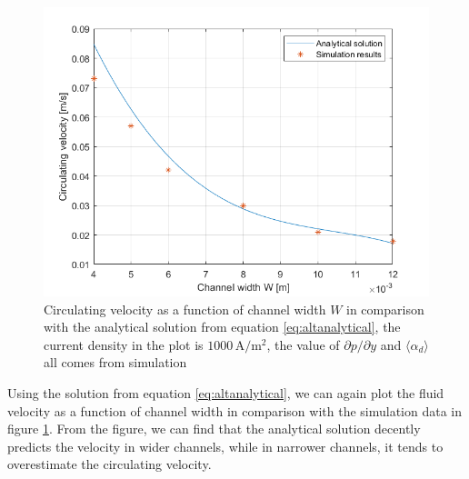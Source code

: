 \begin{figure}[H]
    \centering
    \includegraphics[scale = 0.7]{circulatingcomparison.png}
    \caption{Circulating velocity as a function of channel width $W$ in comparison with the analytical solution from equation \ref{eq:altanalytical}, the current density in the plot is $1000 \, \mathrm{A/m^2}$, the value of $\partial p/ \partial y$ and $\langle \alpha_d \rangle$ all comes from simulation}
    \label{circulatingcomparison}
\end{figure}

Using the solution from equation \ref{eq:altanalytical}, we can again plot the fluid velocity as a function of channel width in comparison with the simulation data in figure \ref{circulatingcomparison}. From the figure, we can find that the analytical solution decently predicts the velocity in wider channels, while in narrower channels, it tends to overestimate the circulating velocity.